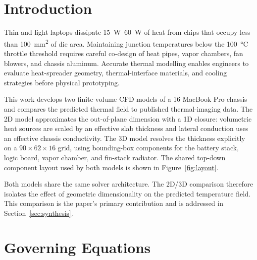 \documentclass[10pt,twocolumn,letterpaper]{article}
\begin{document}
\section{Introduction}

Thin-and-light laptops dissipate
\SIrange{15}{60}{\watt} of heat from chips that occupy less than
\SI{100}{\square\milli\meter} of die area. Maintaining junction
temperatures below the \SI{100}{\celsius} throttle threshold requires
careful co-design of heat pipes, vapor chambers, fan blowers, and
chassis aluminum. Accurate thermal modelling enables engineers to
evaluate heat-spreader geometry, thermal-interface materials, and
cooling strategies before physical prototyping.

This work develops two finite-volume CFD models of a
\SI{16}{\inch} MacBook Pro chassis and compares the predicted
thermal field to published thermal-imaging data. The 2D model
approximates the out-of-plane dimension with a 1D closure:
volumetric heat sources are scaled by an effective slab thickness
and lateral conduction uses an effective chassis conductivity. The
3D model resolves the thickness explicitly on a
$90 \times 62 \times 16$ grid, using bounding-box components for
the battery stack, logic board, vapor chamber, and fin-stack
radiator. The shared top-down component layout used by both models
is shown in Figure~\ref{fig:layout}.

Both models share the same solver architecture. The 2D/3D comparison
therefore isolates the effect of geometric dimensionality on the
predicted temperature field. This comparison is the paper's primary
contribution and is addressed in Section~\ref{sec:synthesis}.

\section{Governing Equations}
\label{sec:gov}
\end{document}
